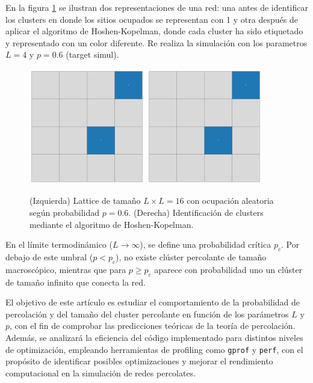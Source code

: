 \documentclass{article}
\begin{document}
En la figura \ref{fig:lattice_clusters} se ilustran dos representaciones de una red: una antes de identificar los clusters en donde los sitios ocupados se representan con 1 y otra después de aplicar el algoritmo de Hoshen-Kopelman, donde cada cluster ha sido etiquetado y representado con un color diferente. Re realiza la simulación con los parametros \( L = 4\) y \( p = 0.6\) (target simul).
\begin{figure}[ht]
    \centering
    \includegraphics[width=0.45\textwidth]{figures/lattice.pdf}
    \hfill
    \includegraphics[width=0.45\textwidth]{figures/clusters.pdf}
    \caption{(Izquierda) Lattice de tamaño \( L \times L = 16\) con ocupación aleatoria según probabilidad \( p = 0.6\). (Derecha) Identificación de clusters mediante el algoritmo de Hoshen-Kopelman.}
    \label{fig:lattice_clusters}
\end{figure}
En el límite termodinámico (\(L \to \infty\)), se define una probabilidad crítica \(p_{c}\). Por debajo de este umbral (\(p < p_{c}\)), no existe clúster percolante de tamaño macroscópico, mientras que para \(p \ge p_{c}\) aparece con probabilidad uno un clúster de tamaño infinito que conecta la red.

El objetivo de este artículo es estudiar el comportamiento de la probabilidad de percolación y del tamaño del cluster percolante en función de los parámetros \(L\) y \(p\), con el fin de comprobar las predicciones teóricas de la teoría de percolación. Además, se analizará la eficiencia del código implementado para distintos niveles de optimización, empleando herramientas de profiling como \texttt{gprof} y \texttt{perf}, con el propósito de identificar posibles optimizaciones y mejorar el rendimiento computacional en la simulación de redes percolates.
\end{document}
